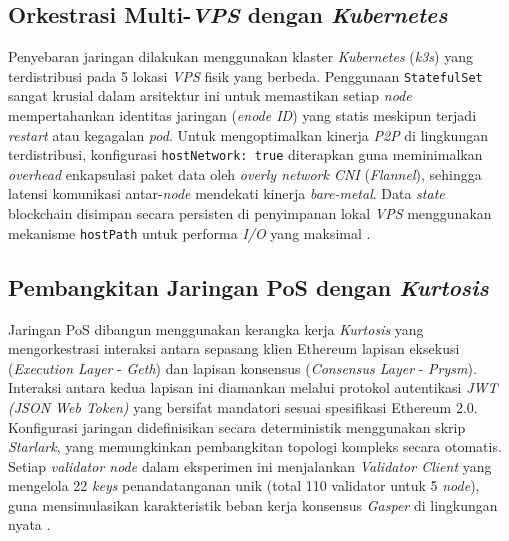 \subsection{Orkestrasi Multi-\textit{VPS} dengan \textit{Kubernetes}}
Penyebaran jaringan dilakukan menggunakan klaster \textit{Kubernetes} (\textit{k3s}) yang terdistribusi pada 5 lokasi \textit{VPS} fisik yang berbeda. Penggunaan \texttt{StatefulSet} sangat krusial dalam arsitektur ini untuk memastikan setiap \textit{node} mempertahankan identitas jaringan (\textit{enode ID}) yang statis meskipun terjadi \textit{restart} atau kegagalan \textit{pod}. Untuk mengoptimalkan kinerja \textit{P2P} di lingkungan terdistribusi, konfigurasi \texttt{hostNetwork: true} diterapkan guna meminimalkan \textit{overhead} enkapsulasi paket data oleh \textit{overly network CNI} (\textit{Flannel}), sehingga latensi komunikasi antar-\textit{node} mendekati kinerja \textit{bare-metal}. Data \textit{state} blockchain disimpan secara persisten di penyimpanan lokal \textit{VPS} menggunakan mekanisme \texttt{hostPath} untuk performa \textit{I/O} yang maksimal \cite{Repo-Deploy-PoA}.

\subsection{Pembangkitan Jaringan PoS dengan \textit{Kurtosis}}
Jaringan PoS dibangun menggunakan kerangka kerja \textit{Kurtosis} yang mengorkestrasi interaksi antara sepasang klien Ethereum lapisan eksekusi (\textit{Execution Layer} - \textit{Geth}) dan lapisan konsensus (\textit{Consensus Layer} - \textit{Prysm}). Interaksi antara kedua lapisan ini diamankan melalui protokol autentikasi \textit{JWT (JSON Web Token)} yang bersifat mandatori sesuai spesifikasi Ethereum 2.0. Konfigurasi jaringan didefinisikan secara deterministik menggunakan skrip \textit{Starlark}, yang memungkinkan pembangkitan topologi kompleks secara otomatis. Setiap \textit{validator node} dalam eksperimen ini menjalankan \textit{Validator Client} yang mengelola 22 \textit{keys} penandatanganan unik (total 110 validator untuk 5 \textit{node}), guna mensimulasikan karakteristik beban kerja konsensus \textit{Gasper} di lingkungan nyata \cite{Repo-Gen-PoS}.

